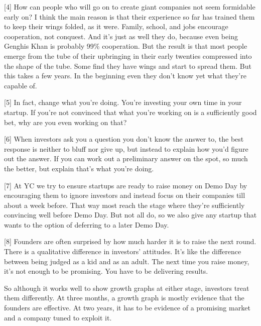 [4] How can people who will go on to create giant companies not
                  seem formidable early on? I think the main reason is that
                  their experience so far has trained them to keep their wings
                  folded, as it were. Family, school, and jobs encourage
                  cooperation, not conquest. And it's just as well they do,
                  because even being Genghis Khan is probably 99\% cooperation.
                  But the result is that most people emerge from the tube of
                  their upbringing in their early twenties compressed into the
                  shape of the tube. Some find they have wings and start to
                  spread them. But this takes a few years. In the beginning even
                  they don't know yet what they're capable of.

[5] In fact, change what you're doing. You're investing your
                  own time in your startup. If you're not convinced that what
                  you're working on is a sufficiently good bet, why are you even
                  working on that?

[6] When investors ask you a question you don't know the answer
                  to, the best response is neither to bluff nor give up, but
                  instead to explain how you'd figure out the answer. If you can
                  work out a preliminary answer on the spot, so much the better,
                  but explain that's what you're doing.

[7] At YC we try to ensure startups are ready to raise money on
                  Demo Day by encouraging them to ignore investors and instead
                  focus on their companies till about a week before. That way
                  most reach the stage where they're sufficiently convincing
                  well before Demo Day. But not all do, so we also give any
                  startup that wants to the option of deferring to a later Demo
                  Day.

[8] Founders are often surprised by how much harder it is to
                  raise the next round. There is a qualitative difference in
                  investors' attitudes. It's like the difference between being
                  judged as a kid and as an adult. The next time you raise
                  money, it's not enough to be promising. You have to be
                  delivering results.

So although it works well to
                  show growth graphs at either stage, investors treat them
                  differently. At three months, a growth graph is mostly
                  evidence that the founders are effective. At two years, it has
                  to be evidence of a promising market and a company tuned to
                  exploit it.

